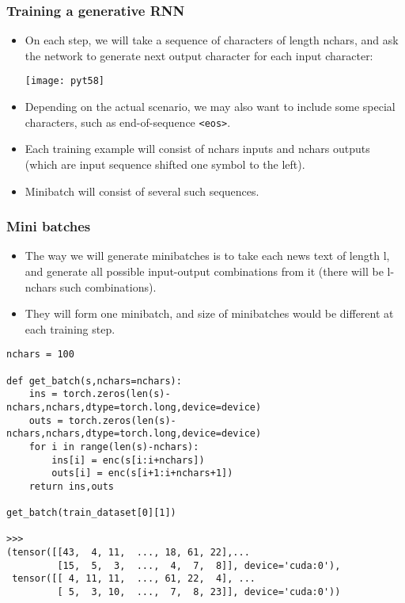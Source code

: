 \begin{frame}[fragile] \frametitle{Training a generative RNN}

\begin{itemize}
\item On each step, we will take a sequence of characters of length nchars, and ask the network to generate next output character for each input character:

\begin{center}
\texttt{[image: pyt58]}
\end{center}

\item Depending on the actual scenario, we may also want to include some special characters, such as end-of-sequence \lstinline|<eos>|. 
\item Each training example will consist of nchars inputs and nchars outputs (which are input sequence shifted one symbol to the left). 
\item Minibatch will consist of several such sequences.
\end{itemize}

\end{frame}

\begin{frame}[fragile] \frametitle{Mini batches}

\begin{itemize}
\item The way we will generate minibatches is to take each news text of length l, and generate all possible input-output combinations from it (there will be l-nchars such combinations). 
\item They will form one minibatch, and size of minibatches would be different at each training step.
\end{itemize}

\begin{lstlisting}
nchars = 100

def get_batch(s,nchars=nchars):
    ins = torch.zeros(len(s)-nchars,nchars,dtype=torch.long,device=device)
    outs = torch.zeros(len(s)-nchars,nchars,dtype=torch.long,device=device)
    for i in range(len(s)-nchars):
        ins[i] = enc(s[i:i+nchars])
        outs[i] = enc(s[i+1:i+nchars+1])
    return ins,outs

get_batch(train_dataset[0][1])

>>>
(tensor([[43,  4, 11,  ..., 18, 61, 22],...
         [15,  5,  3,  ...,  4,  7,  8]], device='cuda:0'),
 tensor([[ 4, 11, 11,  ..., 61, 22,  4], ...
         [ 5,  3, 10,  ...,  7,  8, 23]], device='cuda:0'))
\end{lstlisting}

\end{frame}


